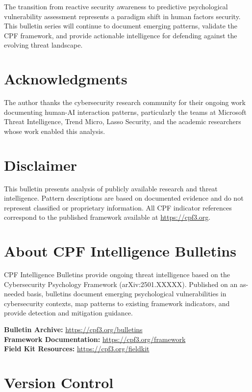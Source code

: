 \documentclass[11pt,a4paper]{article}
\begin{document}
The transition from reactive security awareness to predictive psychological vulnerability assessment represents a paradigm shift in human factors security. This bulletin series will continue to document emerging patterns, validate the CPF framework, and provide actionable intelligence for defending against the evolving threat landscape.

\section*{Acknowledgments}

The author thanks the cybersecurity research community for their ongoing work documenting human-AI interaction patterns, particularly the teams at Microsoft Threat Intelligence, Trend Micro, Lasso Security, and the academic researchers whose work enabled this analysis.

\section*{Disclaimer}

This bulletin presents analysis of publicly available research and threat intelligence. Pattern descriptions are based on documented evidence and do not represent classified or proprietary information. All CPF indicator references correspond to the published framework available at \url{https://cpf3.org}.

\section*{About CPF Intelligence Bulletins}

CPF Intelligence Bulletins provide ongoing threat intelligence based on the Cybersecurity Psychology Framework (arXiv:2501.XXXXX). Published on an as-needed basis, bulletins document emerging psychological vulnerabilities in cybersecurity contexts, map patterns to existing framework indicators, and provide detection and mitigation guidance.

\textbf{Bulletin Archive:} \url{https://cpf3.org/bulletins}\\
\textbf{Framework Documentation:} \url{https://cpf3.org/framework}\\
\textbf{Field Kit Resources:} \url{https://cpf3.org/fieldkit}

\section*{Version Control}
\end{document}
